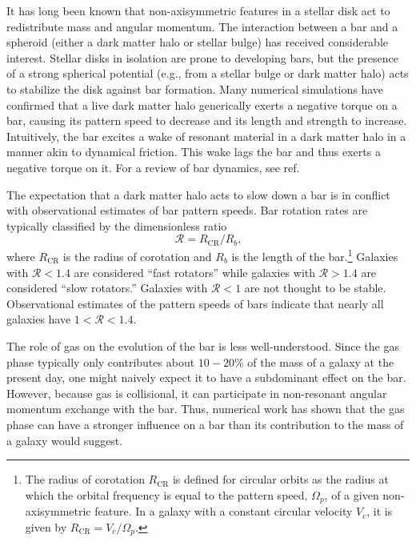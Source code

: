 \documentclass[twoside]{natureprintstyle}
\newcommand{\RCR}{\ensuremath{R_{\textrm{CR}}}}
\newcommand{\Rot}{\ensuremath{\mathcal{R}}}
\begin{document}
It has long been known that non-axisymmetric features in a stellar disk act to
redistribute mass and angular momentum.\cite{1972MNRAS.157....1L} The
interaction between a bar and a spheroid (either a dark matter halo or stellar
bulge) has received considerable interest.\cite{1984MNRAS.209..729T,
1985MNRAS.213..451W} Stellar disks in isolation are prone to developing bars,
\cite{1971ApJ...168..343H} but the presence of a strong spherical potential
(e.g., from a stellar bulge or dark matter halo) acts to stabilize the disk
against bar formation.\cite{1973ApJ...186..467O, 1976AJ.....81...30H} Many
numerical simulations have confirmed that a live dark matter halo generically
exerts a negative torque on a bar, causing its pattern speed to decrease and
its length and strength to increase\cite{1992ApJ...400...80H,
2000ApJ...543..704D, 2002MNRAS.330...35A, 2002ApJ...569L..83A,
2003MNRAS.341.1179A, 2003MNRAS.346..251O, 2005MNRAS.363..991H,
2006ApJ...637..214M, 2007MNRAS.375..460W, 2009ApJ...697..293D}. Intuitively,
the bar excites a wake of resonant material in a dark matter halo in a manner
akin to dynamical friction. This wake lags the bar and thus exerts a negative
torque on it. For a review of bar dynamics, see ref.\cite{1993RPPh...56..173S}

The expectation that a dark matter halo acts to slow down a bar is in
conflict with observational estimates of bar pattern speeds. Bar rotation
rates are typically classified by the dimensionless ratio
\begin{equation}
\Rot = \RCR/R_b\textrm{,}
\end{equation}
where \RCR{} is the radius of corotation and $R_b$ is the length of the
bar.\footnote{The radius of corotation \RCR{} is defined for circular orbits
as the radius at which the orbital frequency is equal to the pattern speed,
$\Omega_p$, of a given non-axisymmetric feature. In a galaxy with a constant
circular velocity $V_c$, it is given by $\RCR = V_c / \Omega_p$.} Galaxies
with $\Rot < 1.4$ are considered ``fast rotators'' while galaxies with $\Rot >
1.4$ are considered ``slow rotators.''\cite{2000ApJ...543..704D} Galaxies with
$\Rot < 1$ are not thought to be stable.\cite{1980AA....81..198C}
Observational estimates of the pattern speeds of bars indicate that nearly all
galaxies have $1 < \Rot < 1.4$.\cite{2011MSAIS..18...23C, 2015AA...576A.102A,
2019MNRAS.482.1733G, 2020MNRAS.491.3655G}

The role of gas on the evolution of the bar is less well-understood. Since the
gas phase typically only contributes about $10-20\%$ of the mass of a galaxy
at the present day, one might naively expect it to have a subdominant effect
on the bar. However, because gas is collisional, it can participate in
non-resonant angular momentum exchange with the bar.\cite{2011MNRAS.415.1027H}
Thus, numerical work has shown that the gas phase can have a stronger
influence on a bar than its contribution to the mass of a galaxy would
suggest.\cite{2010ApJ...719.1470V, 2013MNRAS.429.1949A}
\end{document}
